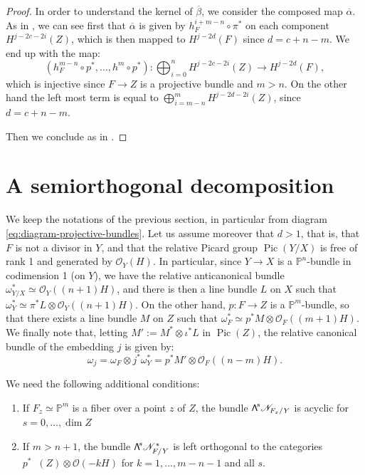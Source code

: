 \documentclass[11pt]{article}
\newcommand\bw[1]{{\hbox{\large$\mathsf{\Lambda}$}^{\!#1}}}
\let\mathcal\mathscr
\theoremstyle{plain}
\theoremstyle{definition}
\newcommand{\cat}[1]{\mathsf{#1}}
\DeclareMathOperator{\Db}{{\cat{D}^{\mathrm{b}}}}
\DeclareMathOperator{\Pic}{Pic}
\newcommand{\PP}{\mathbb{P}}
\newcommand{\sheaf}[1]{\mathcal{#1}}
\newcommand{\kn}{\sheaf{N}}
\newcommand{\ko}{\sheaf{O}}\let\OO\ko\let\cO\ko
\renewcommand{\theenumi}{\alph{enumi}}
\begin{document}
\begin{proof}
In order to understand the kernel of $\overline{\beta}$, we consider the composed map $\overline{\alpha}$.
As in \cite[7.3.3]{voisin-book}, we
can see first that $\overline{\alpha}$ is given by $h_F^{i+m-n}\circ \pi^*$ on each component $H^{j-2c-2i}(Z)$,
which is then mapped to $H^{j-2d}(F)$ since $d=c+n-m$.
We end up with the map:
\[
(h_F^{m-n}\circ p^*,\ldots,h^m \circ p^*): \bigoplus_{i=0}^n H^{j-2c-2i}(Z) \to H^{j-2d}(F),
\]
which is injective since $F \to Z$ is a projective bundle and $m > n$. On the other hand the left most term is equal to $\bigoplus_{i=m-n}^m H^{j-2d-2i}(Z)$, since $d=c+n-m$.

Then we conclude as in \cite[7.3.3]{voisin-book}.
\end{proof}

\section{A semiorthogonal decomposition}\label{sect:appendix-A}

We keep the notations of the previous section, in particular from diagram \eqref{eq:diagram-projective-bundles}.
Let us assume moreover that $d>1$, that is, that $F$ is not a divisor in $Y$, and that the relative Picard
group $\Pic(Y/X)$ is free of rank 1 and generated by $\ko_Y(H)$. In particular, since $Y \to X$ is a $\PP^n$-bundle
in codimension 1 (on $Y$), we have the relative anticanonical bundle $\omega^*_{Y/X} \simeq \ko_Y((n+1)H)$,
and there is then a line bundle $L$ on $X$ such that $\omega^*_Y \simeq \pi^* L\otimes \ko_Y((n+1)H)$.
On the other hand, $p: F \to Z$ is a $\PP^m$-bundle, so that there exists a line bundle $M$ on $Z$
such that $\omega_F^* \simeq p^* M \otimes \ko_F((m+1)H)$. We finally note that, letting $M':=M^* \otimes \iota^* L$ in $\Pic(Z)$,
the relative canonical bundle of the embedding $j$ is given by:
\[
\omega_j = \omega_F \otimes j^*\omega_Y^* = p^*M' \otimes \ko_F((n-m)H).
\]

We need the following additional conditions:

\begin{enumerate}\renewcommand{\theenumi}{C\arabic{enumi}}
\item\label{C1}
If $F_z \simeq \PP^m$ is a fiber over a point $z$ of $Z$,
the bundle $\bw{s} \kn_{F_z/Y}$ is acyclic for $s=0,\ldots,\dim Z$
\item\label{C2}
If $m > n+1$, the bundle $\bw{s} \kn^*_{F/Y}$ is left orthogonal to the categories
$p^* \Db(Z) \otimes \ko(-kH)$ for $k=1,\ldots,m-n-1$ and all $s$.
\end{enumerate}
\end{document}
